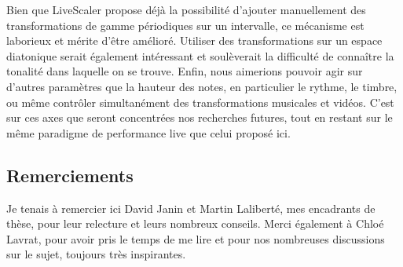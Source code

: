 \documentclass{article}
\begin{document}
Bien que LiveScaler propose déjà la possibilité d'ajouter manuellement des transformations de gamme périodiques sur un intervalle, ce mécanisme est laborieux et mérite d'être amélioré. Utiliser des transformations sur un espace diatonique serait également intéressant et soulèverait la difficulté de connaître la tonalité dans laquelle on se trouve. Enfin, nous aimerions pouvoir agir sur d'autres paramètres que la hauteur des notes, en particulier le rythme, le timbre, ou même contrôler simultanément des transformations musicales et vidéos. C'est sur ces axes que seront concentrées nos recherches futures, tout en restant sur le même paradigme de performance live que celui proposé ici.


\subsection{Remerciements}
Je tenais à remercier ici David Janin et Martin Laliberté, mes encadrants de thèse, pour leur relecture et leurs nombreux conseils. Merci également à Chloé Lavrat, pour avoir pris le temps de me lire et pour nos nombreuses discussions sur le sujet, toujours très inspirantes.

\newpage

%
%
\end{document}
